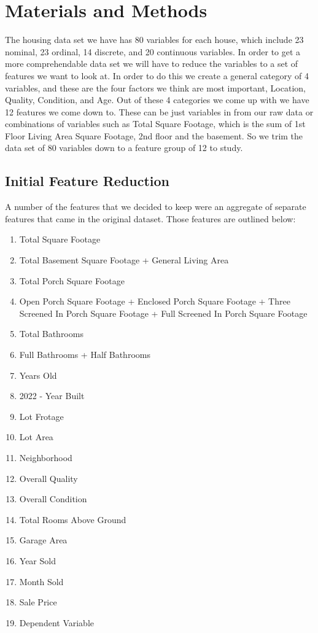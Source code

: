 \documentclass{article}
\begin{document}
	
	\section{Materials and Methods}
	The housing data set we have has 80 variables for each house, which include 23 nominal, 23 ordinal, 14 discrete, and 20 continuous variables. In order to get a more comprehendable data set we will have to reduce the variables to a set of features we want to look at. In order to do this we create a general category of 4 variables, and these are the four factors we think are most important, Location, Quality, Condition, and Age. Out of these 4 categories we come up with we have 12 features we come down to. These can be just variables in from our raw data or combinations of variables such as Total Square Footage, which is the sum of 1st Floor Living Area Square Footage, 2nd floor and the basement. So we trim the data set of 80 variables down to a feature group of 12 to study.

	\subsection{Initial Feature Reduction}

	A number of the features that we decided to keep were an aggregate of separate features that came in the original dataset. Those features are outlined below:

	\begin{enumerate}
		\item Total Square Footage
		\item[\textbullet] Total Basement Square Footage + General Living Area
		\item Total Porch Square Footage
		\item[\textbullet] Open Porch Square Footage + Enclosed Porch Square Footage + Three Screened In Porch Square Footage + Full Screened In Porch Square Footage
		\item Total Bathrooms
		\item[\textbullet] Full Bathrooms + Half Bathrooms
		\item Years Old
		\item[\textbullet] 2022 - Year Built
		\item Lot Frotage
		\item Lot Area
		\item Neighborhood
		\item Overall Quality
		\item Overall Condition
		\item Total Rooms Above Ground
		\item Garage Area
		\item Year Sold
		\item Month Sold
		\item Sale Price
		\item Dependent Variable
	\end{enumerate}
\end{document}
